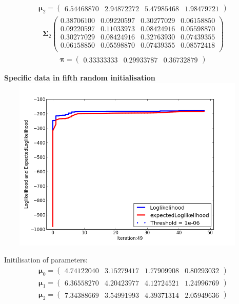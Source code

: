 \documentclass[11pt,a4paper]{article}
\newcommand{\htab}{\hspace*{0.63cm}}
\newcommand{\bs}[1]{\boldsymbol{#1}}
\begin{document}
\begin{align} \bs{\mu}_{2} = \begin{pmatrix} 
6.54468870 & 2.94872272 & 5.47985468 & 1.98479721 
 \end{pmatrix}  \end{align}\vspace{-1cm} 
\begin{align} \bs{\Sigma}_{2}\begin{pmatrix} 
0.38706100 & 0.09220597 & 0.30277029 & 0.06158850 \\ 
0.09220597 & 0.11033973 & 0.08424916 & 0.05598870 \\ 
0.30277029 & 0.08424916 & 0.32763930 & 0.07439355 \\ 
0.06158850 & 0.05598870 & 0.07439355 & 0.08572418 \\ 
\end{pmatrix} \end{align}
\begin{align}  \bs{\pi} = \begin{pmatrix}
    0.33333333 & 0.29933787  & 0.36732879
\end{pmatrix} \end{align}
\newpage
\begin{center}
    \textbf{Specific data in fifth random initialisation}
    \includegraphics[width=5in,height=3.3in]{./Result/figure_5.png}
\end{center}
\htab Initilisation of parameters:
\begin{align} 
    \bs{\mu}_{0} = \begin{pmatrix} 
4.74122040 & 3.15279417 & 1.77909908 & 0.80293032 
 \end{pmatrix}   \\
    \bs{\mu}_{1} = \begin{pmatrix} 
6.36558270 & 4.20423977 & 4.12724521 & 1.24996769 
 \end{pmatrix}    \\
    \bs{\mu}_{2} = \begin{pmatrix} 
7.34388669 & 3.54991993 & 4.39371314 & 2.05949636 
    \end{pmatrix}  \end{align} \vspace{-1cm}
\end{document}
